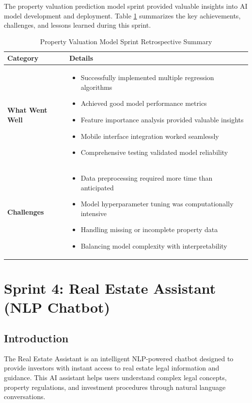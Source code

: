 The property valuation prediction model sprint provided valuable insights into AI model development and deployment. Table \ref{tab:valuation-retrospective} summarizes the key achievements, challenges, and lessons learned during this sprint.
\begin{table}[htbp]
    \centering
    \begin{tabular}{|p{3cm}|p{10cm}|}
        \hline
        \textbf{Category} & \textbf{Details} \\
        \hline
        \textbf{What Went Well} & 
        \begin{itemize}
            \item Successfully implemented multiple regression algorithms
            \item Achieved good model performance metrics
            \item Feature importance analysis provided valuable insights
            \item Mobile interface integration worked seamlessly
            \item Comprehensive testing validated model reliability
        \end{itemize} \\
        \hline
        \textbf{Challenges} & 
        \begin{itemize}
            \item Data preprocessing required more time than anticipated
            \item Model hyperparameter tuning was computationally intensive
            \item Handling missing or incomplete property data
            \item Balancing model complexity with interpretability
        \end{itemize} \\
        \hline
    \end{tabular}
    \caption{Property Valuation Model Sprint Retrospective Summary}
    \label{tab:valuation-retrospective}
\end{table}

\newpage

\section{Sprint 4: Real Estate Assistant (NLP Chatbot)}
\subsection*{Introduction}
The Real Estate Assistant is an intelligent NLP-powered chatbot designed to provide investors with instant access to real estate legal information and guidance. This AI assistant helps users understand complex legal concepts, property regulations, and investment procedures through natural language conversations.

